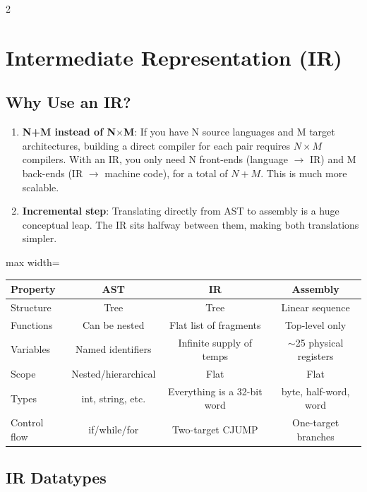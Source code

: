 \documentclass[9pt,landscape]{extarticle}
\begin{document}
\begin{multicols}{2}
\section{Intermediate Representation (IR)}

\subsection{Why Use an IR?}

\begin{enumerate}
  \item \textbf{N+M instead of N$\times$M}: If you have N source languages and M target architectures, building a direct compiler for each pair requires $N \times M$ compilers. With an IR, you only need N front-ends (language $\to$ IR) and M back-ends (IR $\to$ machine code), for a total of $N + M$. This is much more scalable.
  \item \textbf{Incremental step}: Translating directly from AST to assembly is a huge conceptual leap. The IR sits halfway between them, making both translations simpler.
\end{enumerate}

\begin{adjustbox}{max width=\columnwidth}
\begin{tabular}{@{}lccc@{}}
\toprule
\textbf{Property} & \textbf{AST} & \textbf{IR} & \textbf{Assembly} \\
\midrule
Structure & Tree & Tree & Linear sequence \\
Functions & Can be nested & Flat list of fragments & Top-level only \\
Variables & Named identifiers & Infinite supply of temps & $\sim$25 physical registers \\
Scope & Nested/hierarchical & Flat & Flat \\
Types & int, string, etc. & Everything is a 32-bit word & byte, half-word, word \\
Control flow & if/while/for & Two-target CJUMP & One-target branches \\
\bottomrule
\end{tabular}
\end{adjustbox}

\subsection{IR Datatypes}


\end{multicols}
\end{document}
